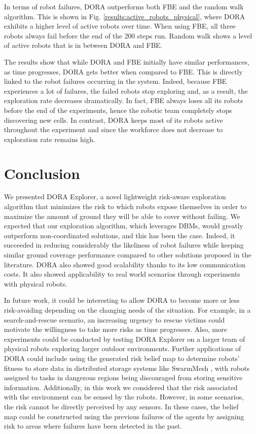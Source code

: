 \documentclass[letterpaper, 10 pt, conference]{ieeeconf}
\begin{document}
In terms of robot failures, DORA outperforms both FBE and the random
walk algorithm. This is shown in
Fig. \ref{results:active_robots_physical}, where DORA exhibits a
higher level of active robots over time. When using FBE, all three
robots always fail before the end of the 200 steps run. Random walk
shows a level of active robots that is in between DORA and FBE.

The results show that while DORA and FBE initially have similar performances, as time progresses,
DORA gets better when compared to FBE. This is directly linked to the
robot failures occurring in the system. Indeed, because FBE
experiences a lot of failures, the failed robots stop exploring and, as
a result, the exploration rate decreases dramatically. In fact, FBE
always loses all its robots before the end of the experiments, hence
the robotic team completely stops discovering new cells. In contrast,
DORA keeps most of its robots active throughout the experiment and
since the workforce does not decrease to exploration rate remains
high.

\section{Conclusion}
We presented DORA Explorer, a novel lightweight risk-aware exploration
algorithm that minimizes the risk to which robots expose themselves in
order to maximize the amount of ground they will be able to cover
without failing. We expected that our exploration algorithm, which
leverages DBMs, would greatly outperform non-coordinated solutions,
and this has been the case. Indeed, it succeeded in reducing
considerably the likeliness of robot failures while keeping similar
ground coverage performance compared to other solutions proposed in
the literature. DORA also showed good scalability thanks to its low
communication costs. It also showed applicability to real world
scenarios through experiments with physical robots.

In future work, it could be interesting to allow DORA to become more
or less risk-avoiding depending on the changing needs of the
situation. For example, in a search-and-rescue scenario, an increasing
urgency to rescue victims could motivate the willingness to take more
risks as time progresses. Also, more experiments could be conducted by
testing DORA Explorer on a larger team of physical robots exploring
larger outdoor environments. Further applications of DORA could
include using the generated risk belief map to determine robots'
fitness to store data in distributed storage systems like SwarmMesh
\cite{majcherczykSwarmmesh2020}, with robots assigned to tasks in
dangerous regions being discouraged from storing sensitive
information. Additionally, in this work we considered that the risk
associated with the environment can be sensed by the robots. However,
in some scenarios, the risk cannot be directly perceived by any
sensors. In these cases, the belief map could be constructed using the
previous failures of the agents by assigning risk to areas where
failures have been detected in the past.




\end{document}
